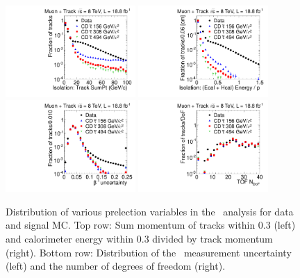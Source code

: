 \begin{figure}
\centering
  \includegraphics[clip=true, trim=0.0cm 0cm 2.8cm 0cm, width=0.44\textwidth]{figures/tkmu/Selection_Comp_8TeV_GMStau_IsolT_BS}
  \includegraphics[clip=true, trim=0.0cm 0cm 2.8cm 0cm, width=0.44\textwidth]{figures/tkmu/Selection_Comp_8TeV_GMStau_IsolE_BS} \\
  \includegraphics[clip=true, trim=0.0cm 0cm 2.8cm 0cm, width=0.44\textwidth]{figures/tkmu/Selection_Comp_8TeV_GMStau_TOFError_BS}
  \includegraphics[clip=true, trim=0.0cm 0cm 2.8cm 0cm, width=0.44\textwidth]{figures/tkmu/Selection_Comp_8TeV_GMStau_nDof_BS}
  \caption[Distribution of tracker and calorimeter isolation as well as the \invbeta\ measurement number of degrees of freedom and uncertainty
in the \tktof\ analysis for data and signal MC.]
{Distribution of various prelection variables in the \tktof\ analysis for data and signal MC.
Top row: Sum momentum of tracks within 0.3 (left) and calorimeter energy within 0.3 divided by track momentum (right).
Bottom row: Distribution of the \invbeta\ measurement uncertainty (left) and the number of degrees of freedom (right).}
    \label{fig:TkMuPreselC}
\end{figure}

